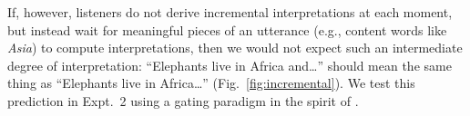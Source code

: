 \documentclass[10pt,letterpaper]{article}
\begin{document}
If, however, listeners do not derive incremental interpretations at each moment, but instead wait for meaningful pieces of an utterance (e.g., content words like \emph{Asia}) to compute interpretations, then we would not expect such an intermediate degree of interpretation: ``Elephants live in Africa and\ldots'' should mean the same thing as ``Elephants live in Africa\ldots'' (Fig.~\ref{fig:incremental}). 
We test this prediction in Expt.~2 using a gating paradigm in the spirit of .


\end{document}
